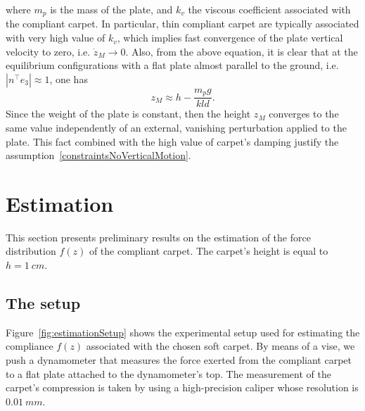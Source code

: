 \documentclass{article}
\begin{document}
where $m_p$ is the mass of the plate, and $k_v$ the viscous coefficient associated with the compliant carpet. In particular, thin compliant carpet are
typically  associated with very high value of $k_v$, which implies fast convergence of the plate vertical velocity to zero, i.e. $\dot{z}_M \rightarrow 0$. Also,  from the above equation, it is clear that at the equilibrium configurations with a flat plate almost parallel to the ground, i.e. $|n^\top e_3| \approx 1$, one has 
\begin{equation}
 z_M  \approx h-\frac{m_pg}{kld}  . \nonumber
\end{equation}
Since the weight of the plate is constant, then the height $z_M$ converges to the same value independently of an external, vanishing perturbation applied to the plate. This fact combined with the high value of carpet's damping justify the assumption~\eqref{constraintsNoVerticalMotion}.

\section{Estimation}
This section presents preliminary results on the estimation of the force distribution $f(z)$ of the compliant carpet. The carpet's height is equal to $h = 1 \ cm$. 
\begin{figure}[t]
\end{figure}
\subsection{The setup}
Figure~\ref{fig:estimationSetup} shows the experimental setup used for estimating the compliance $f(z)$ associated with the chosen soft carpet. 
By means of a vise, we push a dynamometer that measures the force exerted from the compliant carpet to a flat plate attached to the  dynamometer's top.
The measurement of the carpet's compression is taken by using a high-precision caliper whose resolution is $0.01 \ mm$.
\end{document}
